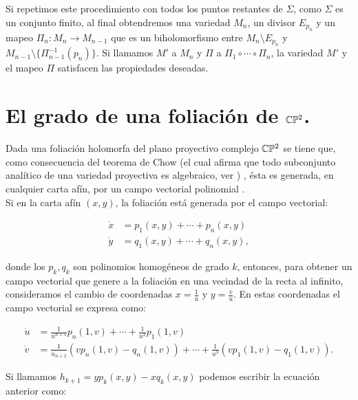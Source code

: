 Si repetimos este procedimiento con todos los puntos restantes de $\Sigma$, como $\Sigma$ es un conjunto finito, al final obtendremos una variedad $M_{n}$, un divisor $E_{p_{n}}$ y un mapeo $\Pi_{n}\colon M_{n}\rightarrow M_{n-1}$ que es un biholomorfismo entre $M_{n}\setminus E_{p_{n}}$ y $M_{n-1}\setminus \{\Pi^{-1}_{n-1}(p_{n})\}$. Si llamamos $M'$ a $M_{n}$ y $\Pi$ a $\Pi_{1}\circ\cdots\circ\Pi_{n}$, la variedad $M'$ y el mapeo $\Pi$ satisfacen las propiedades deseadas.   
 
\section{El grado de una foliación de $\mathbb{C}\mathbb{P}^{2}$.}
\label{Sec:GradoFoliacion}
Dada una foliación holomorfa del plano proyectivo complejo $\mathbb{C}\mathbb{P}^2$ se tiene que, como consecuencia del teorema de Chow (el cual afirma que todo subconjunto analítico de una variedad proyectiva es algebraico, ver \cite{Mumford}) , ésta es generada, en cualquier carta afín, por un campo vectorial polinomial \cite[p.~477]{IlyaYako}.\\

Si en la carta afín $(x,y)$, la foliación está generada por el campo vectorial:

\begin{equation}
\label{EcuacionEnCP2}
\begin{aligned}
\dot{x} &=p_{1}(x,y)+\cdots+p_{n}(x,y)\\
\dot{y} &=q_{1}(x,y)+\cdots+q_{n}(x,y),
\end{aligned}
\end{equation}

\noindent donde los $p_{k},q_{k}$ son polinomios homogéneos de grado $k$, entonces, para obtener un campo vectorial que genere a la foliación en una vecindad de la recta al infinito, consideramos el cambio de coordenadas $x=\tfrac{1}{u}$ y $y=\tfrac{v}{u}$. En estas coordenadas el campo vectorial se expresa como:

\begin{equation}
\begin{aligned}
\dot{u} &=\frac{1}{u^{n+1}}p_{n}(1,v)+\cdots+\frac{1}{u^{2}}p_{1}(1,v)\\
\dot{v} &=\frac{1}{u_{n+2}}(vp_{n}(1,v)-q_{n}(1,v))+\cdots+\frac{1}{u^{3}}(vp_{1}(1,v)-q_{1}(1,v)).
\end{aligned}
\end{equation}

Si llamamos $h_{k+1}=yp_{k}(x,y)-xq_{k}(x,y)$ podemos escribir la ecuación anterior como:

